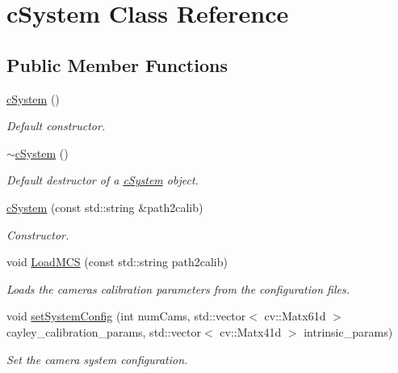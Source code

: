\hypertarget{classcSystem}{}\section{c\+System Class Reference}
\label{classcSystem}
\subsection*{Public Member Functions}
\begin{DoxyCompactItemize}
\item 
\hyperlink{classcSystem_a6d79f7297df51a1c01eda770ee35f787}{c\+System} ()
\begin{DoxyCompactList}\small\item\em Default constructor. \end{DoxyCompactList}\item 
\mbox{\label{classcSystem_af2cdf72ac6ea96ce574cc6f7dfe06f8e}} 
\hyperlink{classcSystem_af2cdf72ac6ea96ce574cc6f7dfe06f8e}{$\sim$c\+System} ()
\begin{DoxyCompactList}\small\item\em Default destructor of a \hyperlink{classcSystem}{c\+System} object. \end{DoxyCompactList}\item 
\hyperlink{classcSystem_a05f411bbf675671c4285dfd855eb9e84}{c\+System} (const std\+::string \&path2calib)
\begin{DoxyCompactList}\small\item\em Constructor. \end{DoxyCompactList}\item 
void \hyperlink{classcSystem_adf0d3a26903fdcbf038e2d2f4334f60f}{Load\+M\+CS} (const std\+::string path2calib)
\begin{DoxyCompactList}\small\item\em Loads the cameras calibration parameters from the configuration files. \end{DoxyCompactList}\item 
void \hyperlink{classcSystem_a77c7c0e0aef5a2ca046e3f562c847f72}{set\+System\+Config} (int num\+Cams, std\+::vector$<$ cv\+::\+Matx61d $>$ cayley\+\_\+calibration\+\_\+params, std\+::vector$<$ cv\+::\+Matx41d $>$ intrinsic\+\_\+params)
\begin{DoxyCompactList}\small\item\em Set the camera system configuration. \end{DoxyCompactList}\item 

\end{DoxyCompactItemize}
